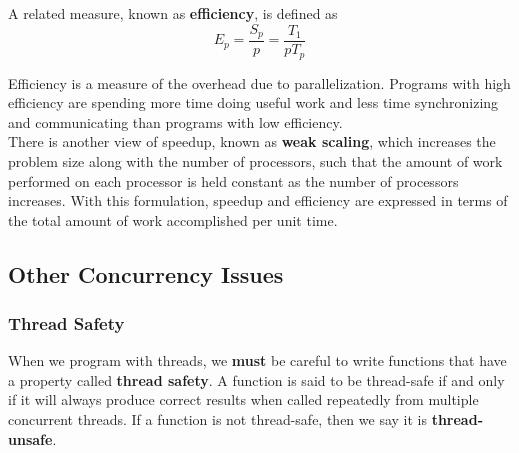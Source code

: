 \documentclass[11pt]{article}
\begin{document}
A related measure, known as \textbf{efficiency}, is defined as\\
\begin{equation}
E_p = \frac{S_p}{p} = \frac{T_1}{pT_p}
\end{equation}

Efficiency is a measure of the overhead due to parallelization. Programs with high efficiency are spending more time doing useful work and less time synchronizing and communicating than programs with low efficiency.\\


There is another view of speedup, known as \textbf{weak scaling}, which increases the problem size along with the number of processors, such that the amount of work performed on each processor is held constant as the number of processors increases. With this formulation, speedup and efficiency are expressed in terms of the total amount of work accomplished per unit time.\\


\subsection{Other Concurrency Issues}
\label{sec:org3bd3b6d}

\subsubsection{Thread Safety}
\label{sec:org14146bb}

When we program with threads, we \textbf{must} be careful to write functions that have a property called \textbf{thread safety}. A function is said to be thread-safe if and only if it will always produce correct results when called repeatedly from multiple concurrent threads. If a function is not thread-safe, then we say it is \textbf{thread-unsafe}.\\
\end{document}
